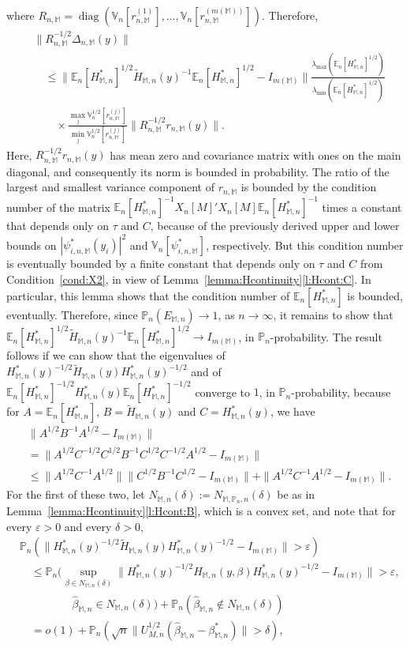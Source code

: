 \documentclass[preprint]{imsart}
\newcommand{\E}{{\mathbb E}}
\newcommand{\V}{{\mathbb V}}
\renewcommand{\P}{{\mathbb P}}
\newcommand{\eps}{\varepsilon}
\newcommand{\M}{\mathbb M}
\newcommand{\lmax}{\lambda_{\max}}
\newcommand{\lmin}{\lambda_{\min}}
\DeclareMathOperator{\diag}{diag}
\numberwithin{equation}{section}
\begin{document}
where $R_{n,\M} = \diag(\V_n[r_{n,\M}^{(1)}], \dots, \V_n[r_{n,\M}^{(m(\M))}])$. Therefore, 
\begin{align*}
&\|R_{n,\M}^{-1/2}\Delta_{n,\M}(y)\| \\
&\quad\le 
\|\E_n[H_{\M,n}^*]^{1/2}\tilde{H}_{\M,n}(y)^{-1}\E_n[H_{\M,n}^*]^{1/2} - I_{m(\M)}\| \frac{\lmax(\E_n[H_{\M,n}^*]^{1/2})}{\lmin(\E_n[H_{\M,n}^*]^{1/2})}\\
&\quad\quad\times\frac{\max_j \V_n^{1/2}[r_{n,\M}^{(j)}]}{\min_j \V_n^{1/2}[r_{n,\M}^{(j)}]} \|R_{n,\M}^{-1/2}r_{n,\M}(y)\|.
\end{align*}
Here, $R_{n,\M}^{-1/2}r_{n,\M}(y)$ has mean zero and covariance matrix with ones on the main diagonal, and consequently its norm is bounded in probability. The ratio of the largest and smallest variance component of $r_{n,\M}$ is bounded by the condition number of the matrix $\E_n[H_{\M,n}^*]^{-1}X_n[M]'X_n[M]\E_n[H_{\M,n}^*]^{-1}$ times a constant that depends only on $\tau$ and $C$, because of the previously derived upper and lower bounds on $|\psi_{i,n,\M}^*(y_i)|^2$ and $\V_n[\psi_{i,n,\M}^*]$, respectively. But this condition number is eventually bounded by a finite constant that depends only on $\tau$ and $C$ from Condition~\ref{cond:X2}, in view of Lemma~\ref{lemma:Hcontinuity}\ref{l:Hcont:C}. In particular, this lemma shows that the condition number of $\E_n[H_{\M,n}^*]$ is bounded, eventually. 
Therefore, since $\P_n(E_{\M,n})\to 1$, as $n\to\infty$, it remains to show that $\E_n[H_{\M,n}^*]^{1/2}\tilde{H}_{\M,n}(y)^{-1}\E_n[H_{\M,n}^*]^{1/2}  \to I_{m(\M)}$, in $\P_n$-probability. The result follows if we can show that the eigenvalues of $H_{\M,n}^*(y)^{-1/2}\tilde{H}_{\M,n}(y)H_{\M,n}^*(y)^{-1/2}$ and of $\E_n[H_{\M,n}^*]^{-1/2}H_{\M,n}^*(y)\E_n[H_{\M,n}^*]^{-1/2}$ converge to $1$, in $\P_n$-probability, because for $A=\E_n[H_{\M,n}^*]$, $B=\tilde{H}_{\M,n}(y)$ and $C=H_{\M,n}^*(y)$, we have
\begin{align*}
&\| A^{1/2}B^{-1}A^{1/2}  - I_{m(\M)}\| \\
&=
\| A^{1/2}C^{-1/2}C^{1/2}B^{-1}C^{1/2}C^{-1/2}A^{1/2}  - I_{m(\M)}\| \\
&\le
\| A^{1/2}C^{-1}A^{1/2}\| \|C^{1/2}B^{-1}C^{1/2} - I_{m(\M)}\| + \|A^{1/2}C^{-1}A^{1/2}  - I_{m(\M)}\|.
\end{align*}
For the first of these two, let $N_{\M,n}(\delta) := N_{\M,\P_n,n}(\delta)$ be as in Lemma~\ref{lemma:Hcontinuity}\ref{l:Hcont:B}, which is a convex set, and note that for every $\eps>0$ and every $\delta>0$, 
\begin{align*}
&\P_n\left( \|H_{\M,n}^*(y)^{-1/2}\tilde{H}_{\M,n}(y)H_{\M,n}^*(y)^{-1/2} - I_{m(\M)}\|>\eps\right)\\
&\quad\le
\P_n\Big( \sup_{\beta\in N_{\M,n}(\delta)}\|H_{\M,n}^*(y)^{-1/2} H_{\M,n}(y,\beta)H_{\M,n}^*(y)^{-1/2} - I_{m(\M)}\|>\eps,\\
&\hspace{2cm}  \hat{\beta}_{\M,n}\in N_{\M,n}(\delta)\Big)
+
\P_n\left( \hat{\beta}_{\M,n}\notin N_{\M,n}(\delta)\right)\\
&\quad=
o(1) + \P_n\left( \sqrt{n}\|U_{M,n}^{1/2}(\hat{\beta}_{\M,n} - \beta_{\M,n}^*)\|>\delta\right),
\end{align*}
\end{document}
